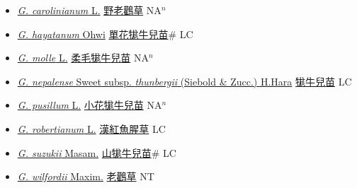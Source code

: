 \begin{itemize}
  \begin{itemize}
        \item[] \href{http://www.theplantlist.org/tpl1.1/search?q=Geranium+carolinianum}{\textit{G. carolinianum} L.}   \href{\detokenize{http://taibnet.sinica.edu.tw/chi/taibnet_species_list.php?T2=野老鸛草&T2_new_value=true&fr=y}}{野老鸛草} NA$^n$
        \item[] \href{http://www.theplantlist.org/tpl1.1/search?q=Geranium+hayatanum}{\textit{G. hayatanum} Ohwi}   \href{\detokenize{http://taibnet.sinica.edu.tw/chi/taibnet_species_list.php?T2=單花牻牛兒苗&T2_new_value=true&fr=y}}{單花牻牛兒苗}\# LC
        \item[] \href{http://www.theplantlist.org/tpl1.1/search?q=Geranium+molle}{\textit{G. molle} L.}   \href{\detokenize{http://taibnet.sinica.edu.tw/chi/taibnet_species_list.php?T2=柔毛牻牛兒苗&T2_new_value=true&fr=y}}{柔毛牻牛兒苗} NA$^n$
        \item[] \href{http://www.theplantlist.org/tpl1.1/search?q=Geranium+nepalense+subsp.+thunbergii}{\textit{G. nepalense} Sweet subsp. \textit{thunbergii} (Siebold \& Zucc.) H.Hara}   \href{\detokenize{http://taibnet.sinica.edu.tw/chi/taibnet_species_list.php?T2=牻牛兒苗&T2_new_value=true&fr=y}}{牻牛兒苗} LC
        \item[] \href{http://www.theplantlist.org/tpl1.1/search?q=Geranium+pusillum}{\textit{G. pusillum} L.}   \href{\detokenize{http://taibnet.sinica.edu.tw/chi/taibnet_species_list.php?T2=小花牻牛兒苗&T2_new_value=true&fr=y}}{小花牻牛兒苗} NA$^n$
        \item[] \href{http://www.theplantlist.org/tpl1.1/search?q=Geranium+robertianum}{\textit{G. robertianum} L.}   \href{\detokenize{http://taibnet.sinica.edu.tw/chi/taibnet_species_list.php?T2=漢紅魚腥草&T2_new_value=true&fr=y}}{漢紅魚腥草} LC
        \item[] \href{http://www.theplantlist.org/tpl1.1/search?q=Geranium+suzukii}{\textit{G. suzukii} Masam.}   \href{\detokenize{http://taibnet.sinica.edu.tw/chi/taibnet_species_list.php?T2=山牻牛兒苗&T2_new_value=true&fr=y}}{山牻牛兒苗}\# LC
        \item[] \href{http://www.theplantlist.org/tpl1.1/search?q=Geranium+wilfordii}{\textit{G. wilfordii} Maxim.}   \href{\detokenize{http://taibnet.sinica.edu.tw/chi/taibnet_species_list.php?T2=老鸛草&T2_new_value=true&fr=y}}{老鸛草} NT
  \end{itemize}
  \end{itemize}

